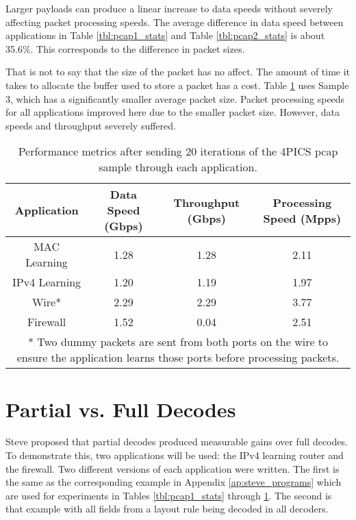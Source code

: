 Larger payloads can produce a linear increase to data speeds without severely affecting packet processing speeds. The average difference in data speed between applications in Table \ref{tbl:pcap1_stats} and Table \ref{tbl:pcap2_stats} is about 35.6\%. This corresponds to the difference in packet sizes.

That is not to say that the size of the packet has no affect. The amount of time it takes to allocate the buffer used to store a packet has a cost. Table \ref{tbl:pcap3_stats} uses Sample 3, which has a significantly smaller average packet size. Packet processing speeds for all applications improved here due to the smaller packet size. However, data speeds and throughput severely suffered.

\begin{table}[ht]
\caption{Performance metrics after sending 20 iterations of the 4PICS pcap sample through each application.}
\begin{center}
\begin{tabular}{| c || c | c | c | }
\hline
Application & Data Speed (Gbps) & Throughput (Gbps) & Processing Speed (Mpps) \\
\hline
MAC Learning & 1.28 & 1.28 & 2.11  \\
\hline
IPv4 Learning & 1.20 & 1.19 & 1.97  \\
\hline 
Wire* & 2.29 & 2.29 & 3.77 \\
\hline
Firewall & 1.52 & 0.04 & 2.51 \\
\hline
\multicolumn{4}{p{\linewidth}}{* Two dummy packets are sent from both ports on the wire to ensure the application learns those ports before processing packets.}
\end{tabular}
\end{center}
\label{tbl:pcap3_stats}
\end{table}


\section{Partial vs. Full Decodes} \label{exp:decode_comparison}

Steve proposed that partial decodes produced measurable gains over full decodes. To demonstrate this, two applications will be used: the IPv4 learning router and the firewall. Two different versions of each application were written. The first is the same as the corresponding example in Appendix \ref{ap:steve_programs} which are used for experiments in Tables \ref{tbl:pcap1_stats} through \ref{tbl:pcap3_stats}. The second is that example with all fields from a layout rule being decoded in all decoders.

